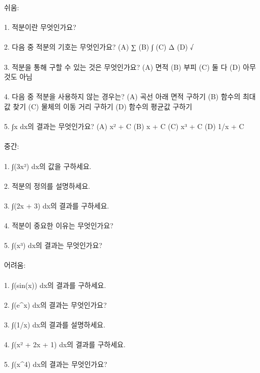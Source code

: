 \documentclass[fleqn]{article}
\begin{document}
      
        쉬움: \\\\  
1. 적분이란 무엇인가요? \\\\  
2. 다음 중 적분의 기호는 무엇인가요? (A) ∑ (B) ∫ (C) Δ (D) √ \\\\  
3. 적분을 통해 구할 수 있는 것은 무엇인가요? (A) 면적 (B) 부피 (C) 둘 다 (D) 아무것도 아님 \\\\  
4. 다음 중 적분을 사용하지 않는 경우는? (A) 곡선 아래 면적 구하기 (B) 함수의 최대값 찾기 (C) 물체의 이동 거리 구하기 (D) 함수의 평균값 구하기 \\\\  
5. ∫x dx의 결과는 무엇인가요? (A) x² + C (B) x + C (C) x³ + C (D) 1/x + C \\\\  

중간: \\\\  
1. ∫(3x²) dx의 값을 구하세요. \\\\  
2. 적분의 정의를 설명하세요. \\\\  
3. ∫(2x + 3) dx의 결과를 구하세요. \\\\  
4. 적분이 중요한 이유는 무엇인가요? \\\\  
5. ∫(x³) dx의 결과는 무엇인가요? \\\\  

어려움: \\\\  
1. ∫(sin(x)) dx의 결과를 구하세요. \\\\  
2. ∫(e^x) dx의 결과는 무엇인가요? \\\\  
3. ∫(1/x) dx의 결과를 설명하세요. \\\\  
4. ∫(x² + 2x + 1) dx의 결과를 구하세요. \\\\  
5. ∫(x^4) dx의 결과는 무엇인가요? \\\\  

      
        
\end{document}

